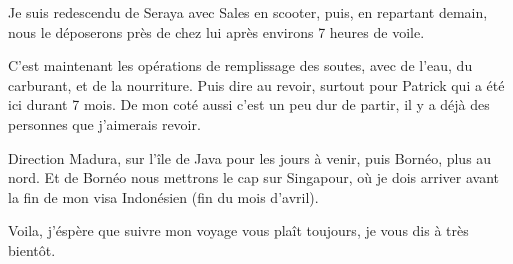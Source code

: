 \begin{multicols}{2}
Je suis redescendu de Seraya avec Sales en scooter, puis, en repartant demain, nous le déposerons près de chez lui après environs 7 heures de voile.

C'est maintenant les opérations de remplissage des soutes, avec de l'eau, du carburant, et de la nourriture. Puis dire au revoir, surtout pour Patrick qui a été ici durant 7 mois. De mon coté aussi c'est un peu dur de partir, il y a déjà des personnes que j'aimerais revoir.

Direction Madura, sur l'île de Java pour les jours à venir, puis Bornéo, plus au nord. Et de Bornéo nous mettrons le cap sur Singapour, où je dois arriver avant la fin de mon visa Indonésien (fin du mois d'avril).

Voila, j'éspère que suivre mon voyage vous plaît toujours, je vous dis à très bientôt.

\end{multicols}



